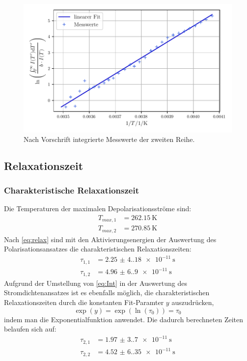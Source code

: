 \begin{figure}
    \centering
    \includegraphics[width=0.8\linewidth]{scripts/build/plot2_2.pdf}
    \caption{Nach Vorschrift integrierte Messwerte der zweiten Reihe.}
    \label{fig:W2_2}
\end{figure}

\subsection{Relaxationszeit}
\subsubsection{Charakteristische Relaxationszeit}
Die Temperaturen der maximalen Depolarisationsströme sind:
\begin{align}
    T_{max,1} &= \qty{262.15}{\kelvin} \\
    T_{max,2} &= \qty{270.85}{\kelvin}
\end{align}
Nach \autoref{eq:relax} sind mit den Aktivierungsenergien der Auswertung des Polarisationsansatzes
die charakteristischen Relaxationszeiten:
\begin{align}
    \tau_{1,1} &= \qty{2.25(4.18)e-11}{\second}\\
    \tau_{1,2} &= \qty{4.96(6.90)e-11}{\second}
\end{align}
Aufgrund der Umstellung von \autoref{eq:Int} in der Auswertung des Stromdichtenansatzes ist es ebenfalls möglich,
die charakteristischen Relaxationszeiten durch die konstanten Fit-Paramter $y$ auszudrücken,
\begin{equation}
    \exp(y) = \exp(\ln(\tau_0)) = \tau_0
\end{equation}
indem man die Exponentialfunktion anwendet.
Die dadurch berechneten Zeiten belaufen sich auf:
\begin{align}
    \tau_{2,1} &= \qty{1.97(3.70)e-11}{\second}\\
    \tau_{2,2} &= \qty{4.52(6.35)e-11}{\second}
\end{align}
